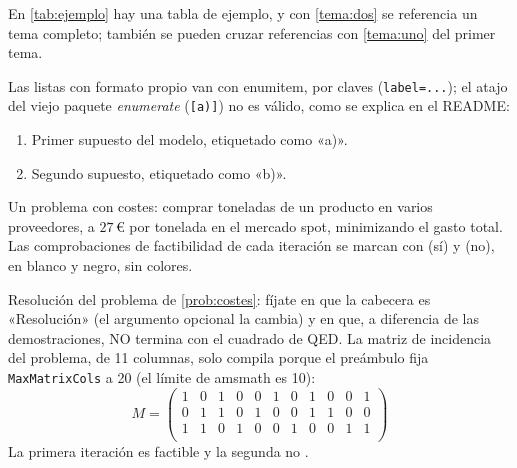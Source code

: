 En \cref{tab:ejemplo} hay una tabla de ejemplo, y con \cref{tema:dos}
se referencia un tema completo; también se pueden cruzar referencias
con \cref{tema:uno} del primer tema.

Las listas con formato propio van con enumitem, por claves
(\texttt{label=...}); el atajo del viejo paquete \emph{enumerate}
(\texttt{[a)]}) no es válido, como se explica en el README:

\begin{enumerate}[label=\alph*)]
    \item Primer supuesto del modelo, etiquetado como «a)».
    \item Segundo supuesto, etiquetado como «b)».
\end{enumerate}

\begin{problema}\label{prob:costes}
    Un problema con costes: comprar toneladas de un producto en
    varios proveedores, a $27\,\euro{}$ por tonelada en el mercado
    spot, minimizando el gasto total. Las comprobaciones de
    factibilidad de cada iteración se marcan con  (sí)
    y  (no), en blanco y negro, sin colores.
\end{problema}

\begin{resolucion}
    Resolución del problema de \cref{prob:costes}: fíjate en que la
    cabecera es «Resolución» (el argumento opcional la cambia) y en
    que, a diferencia de las demostraciones, NO termina con el
    cuadrado de QED. La matriz de incidencia del problema, de 11
    columnas, solo compila porque el preámbulo fija
    \texttt{MaxMatrixCols} a 20 (el límite de amsmath es 10):
    \[
    M =
    \begin{pmatrix}
        1 & 0 & 1 & 0 & 0 & 1 & 0 & 1 & 0 & 0 & 1 \\
        0 & 1 & 1 & 0 & 1 & 0 & 0 & 1 & 1 & 0 & 0 \\
        1 & 1 & 0 & 1 & 0 & 0 & 1 & 0 & 0 & 1 & 1 \\
    \end{pmatrix}
    \]
    La primera iteración es factible  y la segunda no
    .
\end{resolucion}
